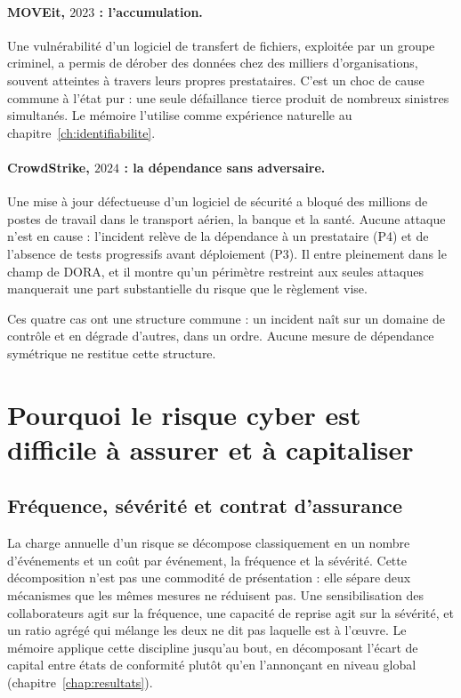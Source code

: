 \paragraph{MOVEit, $2023$ : l'accumulation.} Une vulnérabilité d'un logiciel de transfert de
fichiers, exploitée par un groupe criminel, a permis de dérober des données chez des milliers
d'organisations, souvent atteintes à travers leurs propres prestataires. C'est un choc de cause
commune à l'état pur : une seule défaillance tierce produit de nombreux sinistres simultanés. Le
mémoire l'utilise comme expérience naturelle au chapitre~\ref{ch:identifiabilite}.

\paragraph{CrowdStrike, $2024$ : la dépendance sans adversaire.} Une mise à jour défectueuse d'un
logiciel de sécurité a bloqué des millions de postes de travail dans le transport aérien, la
banque et la santé. Aucune attaque n'est en cause : l'incident relève de la dépendance à un
prestataire (P4) et de l'absence de tests progressifs avant déploiement (P3). Il entre pleinement
dans le champ de DORA, et il montre qu'un périmètre restreint aux seules attaques manquerait une
part substantielle du risque que le règlement vise.

\medskip
\noindent Ces quatre cas ont une structure commune : un incident naît sur un domaine de contrôle
et en dégrade d'autres, dans un ordre. Aucune mesure de dépendance symétrique ne restitue cette
structure.

\section{Pourquoi le risque cyber est difficile à assurer et à capitaliser}
\label{sec:assurabilite-capital}

\subsection{Fréquence, sévérité et contrat d'assurance}
\label{subsec:frequence-severite-contrat}

La charge annuelle d'un risque se décompose classiquement en un nombre d'événements et un coût
par événement, la fréquence et la sévérité. Cette décomposition n'est pas une commodité de
présentation : elle sépare deux mécanismes que les mêmes mesures ne réduisent pas. Une
sensibilisation des collaborateurs agit sur la fréquence, une capacité de reprise agit sur la
sévérité, et un ratio agrégé qui mélange les deux ne dit pas laquelle est à l'\oe uvre. Le
mémoire applique cette discipline jusqu'au bout, en décomposant l'écart de capital entre états de
conformité plutôt qu'en l'annonçant en niveau global (chapitre~\ref{chap:resultats}).

